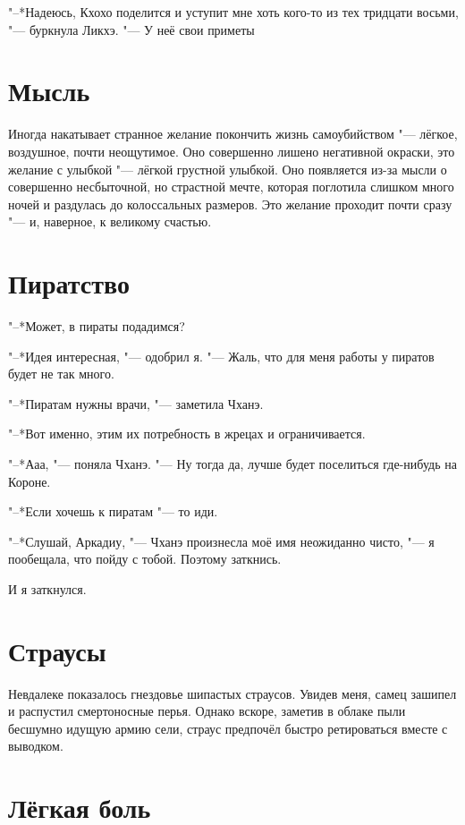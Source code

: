 \documentclass[a4paper,10pt]{book}
\newcommand{\ldotst}{\so{...}\xspace}
\begin{document}
"--*Надеюсь, Кхохо поделится и уступит мне хоть кого-то из тех тридцати восьми, "--- буркнула Ликхэ. "--- У неё свои приметы\ldotst
 
 \section{Мысль}

 Иногда накатывает странное желание покончить жизнь самоубийством "--- лёгкое, воздушное, почти неощутимое. Оно совершенно лишено негативной окраски, это желание с улыбкой "--- лёгкой грустной улыбкой. Оно появляется из-за мысли о совершенно несбыточной, но страстной мечте, которая поглотила слишком много ночей и раздулась до колоссальных размеров. Это желание проходит почти сразу "--- и, наверное, к великому счастью.
 
 \section{Пиратство}

 "--*Может, в пираты подадимся?

"--*Идея интересная, "--- одобрил я. "--- Жаль, что для меня работы у пиратов будет не так много.

"--*Пиратам нужны врачи, "--- заметила Чханэ.

"--*Вот именно, этим их потребность в жрецах и ограничивается.

"--*Ааа, "--- поняла Чханэ. "--- Ну тогда да, лучше будет поселиться где-нибудь на Короне.

"--*Если хочешь к пиратам "--- то иди.

"--*Слушай, Аркадиу, "--- Чханэ произнесла моё имя неожиданно чисто, "--- я пообещала, что пойду с тобой. Поэтому заткнись.

И я заткнулся.
 
 \section{Страусы}

 Невдалеке показалось гнездовье шипастых страусов. Увидев меня, самец зашипел и распустил смертоносные перья. Однако вскоре, заметив в облаке пыли бесшумно идущую армию сели, страус предпочёл быстро ретироваться вместе с выводком.
 
 \section{Лёгкая боль}
\end{document}
